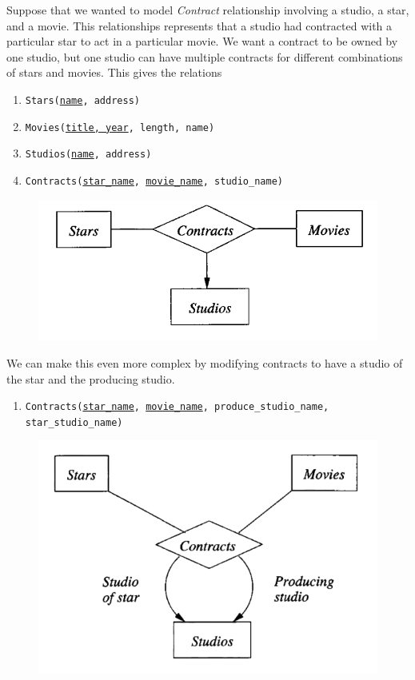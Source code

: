     \begin{example}
      Suppose that we wanted to model \textit{Contract} relationship involving a studio, a star, and a movie. This relationships represents that a studio had contracted with a particular star to act in a particular movie. We want a contract to be owned by one studio, but one studio can have multiple contracts for different combinations of stars and movies. This gives the relations 
      \begin{enumerate}
        \item \texttt{Stars(\underline{name}, address)} 
        \item \texttt{Movies(\underline{title, year}, length, name)} 
        \item \texttt{Studios(\underline{name}, address)} 
        \item \texttt{Contracts(\underline{star\_name}, \underline{movie\_name}, studio\_name)}
      \end{enumerate}
      \begin{figure}[H]
        \centering 
        \includegraphics[scale=0.4]{img/contracts.png}
        \caption{} 
        \label{fig:contracts}
      \end{figure}
      We can make this even more complex by modifying contracts to have a studio of the star and the producing studio. 
      \begin{enumerate}
        \item \texttt{Contracts(\underline{star\_name}, \underline{movie\_name}, produce\_studio\_name, star\_studio\_name)}
      \end{enumerate}
      \begin{figure}[H]
        \centering 
        \includegraphics[scale=0.4]{img/four_ary.png}

\end{figure}
\end{example}
